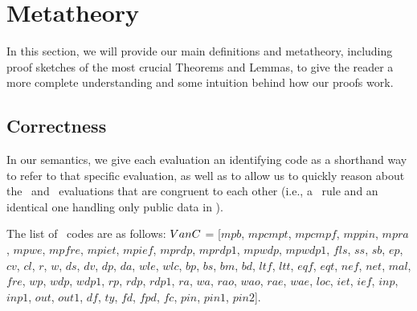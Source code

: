 \section{Metatheory}
\label{app: metatheory}
In this section, we will provide our main definitions and metatheory, including proof sketches of the most crucial Theorems and Lemmas, to give the reader a more complete understanding and some intuition behind how our proofs work. 

\subsection{Correctness}
In our semantics, we give each evaluation an identifying code as a shorthand way to refer to that specific evaluation, as well as to allow us to quickly reason about the \vanillaC\ and \piccoC\ evaluations that are congruent to each other (i.e., a \vanillaC\ rule and an identical one handling only public data in \piccoC). 




The list of \vanillaC\ codes are as follows: 
$VanC$ = 
	[$\mathit{mpb}$, $\mathit{mpcmpt}$, $\mathit{mpcmpf}$, $\mathit{mppin}$, 
	$\mathit{mpra}$, $\mathit{mpwe}$, $\mathit{mpfre}$, $\mathit{mpiet}$, $\mathit{mpief}$,
	$\mathit{mprdp}$, $\mathit{mprdp1}$, $\mathit{mpwdp}$, $\mathit{mpwdp1}$, 
	$\mathit{fls}$, $\mathit{ss}$, $\mathit{sb}$, $\mathit{ep}$, $\mathit{cv}$, $\mathit{cl}$, 
	$\mathit{r}$, $\mathit{w}$, $\mathit{ds}$, $\mathit{dv}$, $\mathit{dp}$, $\mathit{da}$, 
	$\mathit{wle}$, $\mathit{wlc}$, $\mathit{bp}$, $\mathit{bs}$, $\mathit{bm}$, $\mathit{bd}$, 
	$\mathit{ltf}$, $\mathit{ltt}$, $\mathit{eqf}$, $\mathit{eqt}$, $\mathit{nef}$, $\mathit{net}$, 
	$\mathit{mal}$, $\mathit{fre}$, $\mathit{wp}$, $\mathit{wdp}$, $\mathit{wdp1}$, $\mathit{rp}$, 
	$\mathit{rdp}$, $\mathit{rdp1}$, $\mathit{ra}$, $\mathit{wa}$, $\mathit{rao}$, $\mathit{wao}$, 
	$\mathit{rae}$, $\mathit{wae}$, $\mathit{loc}$, $\mathit{iet}$, $\mathit{ief}$,  
	$\mathit{inp}$, $\mathit{inp1}$, $\mathit{out}$, $\mathit{out1}$, $\mathit{df}$, $\mathit{ty}$, 
	$\mathit{fd}$, $\mathit{fpd}$, $\mathit{fc}$, $\mathit{pin}$, $\mathit{pin1}$, $\mathit{pin2}$]. 


